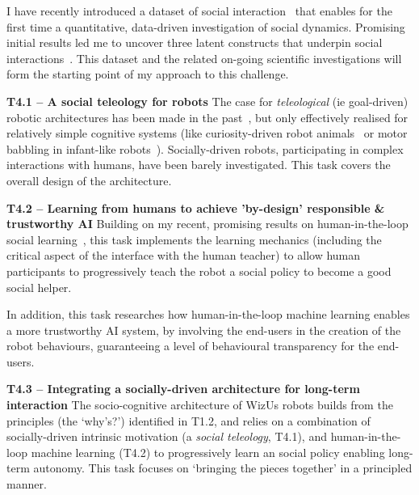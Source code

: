 \documentclass[11pt,a4paper]{report}
\newcommand{\project}{WizUs\xspace}
\begin{document}
I have recently introduced a dataset of social
interaction~\cite{lemaignan2018pinsoro} that enables for the first time a
quantitative, data-driven investigation of social dynamics. Promising initial
results led me to uncover three latent constructs that underpin social
interactions~\cite{bartlett2019what}. This dataset and the related on-going
scientific investigations will form the starting point of my approach to this
challenge.







\textbf{T4.1 -- A social teleology for robots}
The case for \emph{teleological} (ie goal-driven) robotic architectures has been
made in the past~\cite{wrede2012towards}, but only effectively realised for
relatively simple cognitive systems (like curiosity-driven robot
animals~\cite{oudeyer2005playground} or motor babbling in infant-like
robots~\cite{forestier2017unified}). Socially-driven robots, participating in
complex interactions with humans, have been barely investigated. This task
covers the overall design of the architecture.


\textbf{T4.2 -- Learning from humans to achieve 'by-design' responsible \&
trustworthy AI} Building on my recent, promising results on human-in-the-loop
social learning~\cite{senft2017supervised,senft2019teaching,winkle2020couch}, this task
implements the learning mechanics (including the critical aspect of the
interface with the human teacher) to allow human participants to progressively
teach the robot a social policy to become a good social helper.

In addition, this task researches how human-in-the-loop machine learning enables a more
trustworthy AI system, by involving the end-users in the creation of the robot
behaviours, guaranteeing a level of behavioural transparency for the end-users.

\textbf{T4.3 -- Integrating a socially-driven architecture for long-term interaction} The
socio-cognitive architecture of \project robots builds from the principles (the
`why's?') identified in T1.2, and relies on a combination of socially-driven
intrinsic motivation (a \emph{social teleology}, T4.1), and human-in-the-loop machine
learning (T4.2) to progressively learn an social policy enabling long-term
autonomy. This task focuses on `bringing the pieces together' in a principled
manner.
\end{document}

